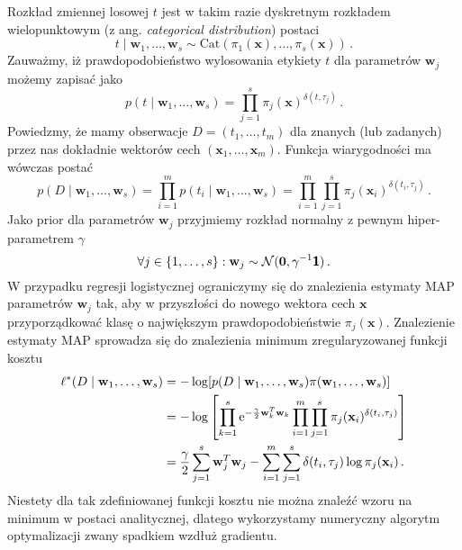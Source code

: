 \documentclass{myclass}
\begin{document}
Rozkład zmiennej losowej \(t\) jest  w takim razie dyskretnym rozkładem wielopunktowym (z ang.
\textit{categorical distribution}) postaci
\begin{equation*}
    t \mid \mathbf{w}_1,\ldots,\mathbf{w}_s \sim \text{Cat}(\pi_1(\mathbf{x}),\ldots,\pi_s(\mathbf{x}))\,.
\end{equation*}
Zauważmy, iż prawdopodobieństwo wylosowania etykiety \(t\) dla parametrów \(\mathbf{w}_j\) możemy
zapisać jako
\begin{equation*}
    p(t \mid \mathbf{w}_1,\ldots,\mathbf{w}_s) = \prod_{j=1}^s \pi_j(\mathbf{x})^{\delta(t,\tau_j)}\,.
\end{equation*}
Powiedzmy, że mamy obserwacje \(D = (t_1,\ldots,t_m)\) dla znanych (lub zadanych) przez nas
dokładnie wektorów cech \((\mathbf{x}_1, \ldots, \mathbf{x}_m)\). Funkcja wiarygodności ma wówczas
postać
\begin{equation*}
    p(D \mid \mathbf{w}_1,\ldots,\mathbf{w}_s) = \prod_{i=1}^m p(t_i \mid \mathbf{w}_1,\ldots,\mathbf{w}_s) = \prod_{i=1}^m \prod_{j=1}^s \pi_j(\mathbf{x}_i)^{\delta(t_i,\tau_j)}\,.
\end{equation*}
Jako prior dla parametrów \(\mathbf{w}_j\) przyjmiemy rozkład normalny z pewnym hiper-parametrem
\(\gamma\)
\begin{equation*}
    \forall j\in \{1,\ldots,s\} : \mathbf{w}_j \sim \mathcal{N}(\mathbf{0}, \gamma^{-1}\boldsymbol{\mathsf{1}})\,.
\end{equation*}
W przypadku regresji logistycznej ograniczymy się do znalezienia estymaty MAP parametrów
\(\mathbf{w}_j\) tak, aby w przyszłości do nowego wektora cech \(\mathbf{x}\) przyporządkować klasę
o największym prawdopodobieństwie \(\pi_j(\mathbf{x})\). Znalezienie estymaty MAP sprowadza się do
znalezienia minimum zregularyzowanej funkcji kosztu
\begin{equation*}
    \begin{split}
        \ell^*(D \mid \mathbf{w}_1,\ldots,\mathbf{w}_s) &= -\log [p(D \mid \mathbf{w}_1,\ldots,\mathbf{w}_s ) \pi(\mathbf{w}_1, \ldots, \mathbf{w}_s)] \\
        &= - \log \left[\prod_{k=1}^s\mathrm{e}^{-\frac{\gamma}{2}\mathbf{w}_k^T\mathbf{w}_k}\prod_{i=1}^m \prod_{j=1}^s \pi_j(\mathbf{x}_i)^{\delta(t_i,\tau_j)}\right]\\
        &= \frac{\gamma}{2}\sum_{j=1}^s \mathbf{w}_j^T\mathbf{w}_j - \sum_{i=1}^m\sum_{j=1}^s \delta(t_i,\tau_j)\log\pi_j(\mathbf{x}_i)\,.
    \end{split}
\end{equation*}
Niestety dla tak zdefiniowanej funkcji kosztu nie można znaleźć wzoru na minimum w postaci
analitycznej, dlatego wykorzystamy numeryczny algorytm optymalizacji zwany spadkiem wzdłuż
gradientu.
\end{document}

